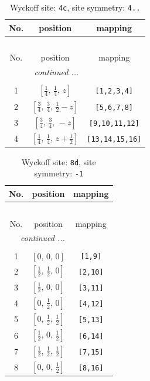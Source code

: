 \documentclass[fleqn,8pt]{jsarticle}
\begin{document}
\renewcommand{\arraystretch}{1.2}
\begin{longtable}{ccc}
\caption{Wyckoff site: {\tt 4c}, site symmetry: {\tt 4..}}
 \\
 \hline \hline
No. & position & mapping \\ \hline \endfirsthead

\multicolumn{2}{l}{\tablename\ \thetable{}} \\
 \hline \hline
No. & position & mapping \\ \hline \endhead

 \hline \hline
\multicolumn{2}{r}{\footnotesize\it continued ...} \\ \endfoot

 \hline \hline
\multicolumn{2}{r}{} \\ \endlastfoot

1 & $\left[ \frac{1}{4},\, \frac{1}{4},\, z \right]$ & {\tt [1,2,3,4]} \\ \hline
2 & $\left[ \frac{3}{4},\, \frac{3}{4},\, \frac{1}{2} - z \right]$ & {\tt [5,6,7,8]} \\ \hline
3 & $\left[ \frac{3}{4},\, \frac{3}{4},\, - z \right]$ & {\tt [9,10,11,12]} \\ \hline
4 & $\left[ \frac{1}{4},\, \frac{1}{4},\, z + \frac{1}{2} \right]$ & {\tt [13,14,15,16]} \\
\end{longtable}
\renewcommand{\arraystretch}{1.2}
\begin{longtable}{ccc}
\caption{Wyckoff site: {\tt 8d}, site symmetry: {\tt -1}}
 \\
 \hline \hline
No. & position & mapping \\ \hline \endfirsthead

\multicolumn{2}{l}{\tablename\ \thetable{}} \\
 \hline \hline
No. & position & mapping \\ \hline \endhead

 \hline \hline
\multicolumn{2}{r}{\footnotesize\it continued ...} \\ \endfoot

 \hline \hline
\multicolumn{2}{r}{} \\ \endlastfoot

1 & $\left[ 0,\, 0,\, 0 \right]$ & {\tt [1,9]} \\ \hline
2 & $\left[ \frac{1}{2},\, \frac{1}{2},\, 0 \right]$ & {\tt [2,10]} \\ \hline
3 & $\left[ \frac{1}{2},\, 0,\, 0 \right]$ & {\tt [3,11]} \\ \hline
4 & $\left[ 0,\, \frac{1}{2},\, 0 \right]$ & {\tt [4,12]} \\ \hline
5 & $\left[ 0,\, \frac{1}{2},\, \frac{1}{2} \right]$ & {\tt [5,13]} \\ \hline
6 & $\left[ \frac{1}{2},\, 0,\, \frac{1}{2} \right]$ & {\tt [6,14]} \\ \hline
7 & $\left[ \frac{1}{2},\, \frac{1}{2},\, \frac{1}{2} \right]$ & {\tt [7,15]} \\ \hline
8 & $\left[ 0,\, 0,\, \frac{1}{2} \right]$ & {\tt [8,16]} \\
\end{longtable}
\end{document}
